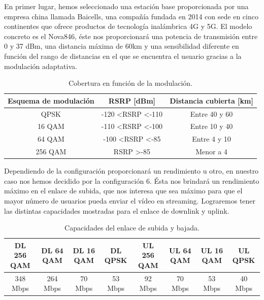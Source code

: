 En primer lugar, hemos seleccionado una estación base proporcionada por una empresa china llamada Baicells, una compañía fundada en 2014 con sede en cinco continentes que ofrece productos de tecnología inalámbrica 4G y 5G. El modelo concreto es el Nova846, éste nos proporcionará una potencia de transmisión entre 0 y 37 dBm, una distancia máxima de 60km y una sensibilidad diferente en función del rango de distancias en el que se encuentra el usuario gracias a la modulación adaptativa.\\

\begin{table}[H]
\centering
\begin{tabular}{|c|c|c|}
\hline
\textbf{Esquema de modulación} & \textbf{RSRP {[}dBm{]}}            & \textbf{Distancia cubierta {[}km{]}} \\ \hline
QPSK                           & -120 \textless RSRP \textless -110 & Entre 40 y 60                        \\ \hline
16 QAM                         & -110 \textless RSRP \textless -100 & Entre 10 y 40                        \\ \hline
64 QAM                         & -100 \textless RSRP \textless -85  & Entre 4 y 10                         \\ \hline
256 QAM                        & RSRP \textgreater -85              & Menor a 4                            \\ \hline
\end{tabular}
\caption{Cobertura en función de la modulación.}
\label{cobertura}
\end{table}

Dependiendo de la configuración proporcionará un rendimiento u otro, en nuestro caso nos hemos decidido por la configuración 6. Ésta nos brindará un rendimiento máximo en el enlace de subida, que nos interesa que sea máximo para que el mayor número de usuarios pueda enviar el vídeo en streaming. Lograremos tener las distintas capacidades mostradas para el enlace de downlink y uplink.\\

\begin{table}[H]
\centering
\begin{tabular}{|c|c|c|c|c|c|c|c|} 
\hline
DL 256 QAM & DL 64 QAM & DL 16 QAM & DL QPSK & UL 256 QAM & UL 64 QAM & UL 16 QAM & UL QPSK \\ \hline
348 Mbps   & 264 Mbps  & 70 Mbps   & 53 Mbps & 92 Mbps    & 70 Mbps   & 53 Mbps   & 40 Mbps \\ \hline
\end{tabular}
\caption{Capacidades del enlace de subida y bajada.}
\label{capacidad}
\end{table}

